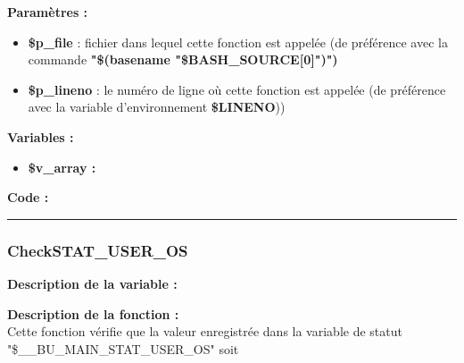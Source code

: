\documentclass[a4paper,10pt]{article}
\begin{document}
\begin{justify}
    \textbf{Paramètres :}

    \begin{itemize}
        \item \color{orange}\textbf{\$p\_file}\color{white} : fichier dans lequel cette fonction est appelée (de préférence avec la commande \textbf{"\$(\color{gray}basename \color{white}"\color{orange}\$BASH\_SOURCE[0]\color{white}")")}\\

        \item \color{orange}\textbf{\$p\_lineno}\color{white} : le numéro de ligne où cette fonction est appelée (de préférence avec la variable d'environnement \textbf{\color{orange}\$LINENO}))
    \end{itemize}
\end{justify}

\begin{justify}
    \textbf{Variables :}

    \begin{itemize}
        \item \textbf{\color{orange}\$v\_array\color{white} :}
    \end{itemize}
\end{justify}

\begin{justify}
    \textbf{Code :}
\end{justify}



\color{blue}\par\noindent\rule{\textwidth}{0.4pt}\color{white}

\color{blue}
\subsubsection{CheckSTAT\_USER\_OS}\color{white}

\begin{justify}
    \textbf{Description de la variable :}\\
    
\end{justify}

\begin{justify}
    \textbf{Description de la fonction :}\\
    Cette fonction vérifie que la valeur enregistrée dans la variable de statut "\$\_\_BU\_MAIN\_STAT\_USER\_OS" soit
\end{justify}
\end{document}
